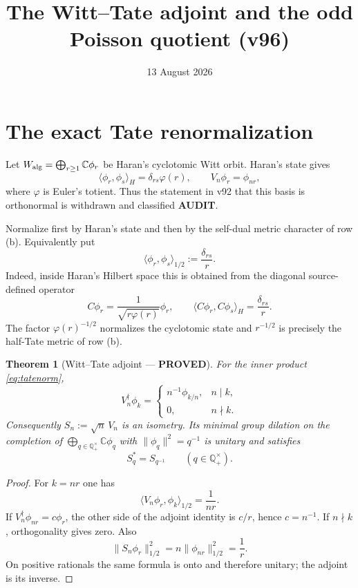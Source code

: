 \documentclass[11pt]{article}
\title{The Witt--Tate adjoint and the odd Poisson quotient (v96)}
\date{13 August 2026}
\newcommand{\PROVED}{\textcolor{green!40!black}{\textbf{PROVED}}}
\newcommand{\AUDIT}{\textcolor{orange!70!black}{\textbf{AUDIT}}}
\newtheorem{theorem}{Theorem}
\begin{document}
\maketitle

\section{The exact Tate renormalization}

Let $W_{\rm alg}=\bigoplus_{r\geq1}\mathbb C\phi_r$ be Haran's
cyclotomic Witt orbit.  Haran's state gives
\[
 \langle\phi_r,\phi_s\rangle_H=\delta_{rs}\varphi(r),
 \qquad V_n\phi_r=\phi_{nr},
\]
where $\varphi$ is Euler's totient.  Thus the statement in v92 that this
basis is orthonormal is withdrawn and classified \AUDIT.

Normalize first by Haran's state and then by the self-dual metric character
of row (b).  Equivalently put
\begin{equation}\label{eq:tatenorm}
 \langle\phi_r,\phi_s\rangle_{1/2}:=\frac{\delta_{rs}}{r}.
\end{equation}
Indeed, inside Haran's Hilbert space this is obtained from the diagonal
source-defined operator
\[
 C\phi_r=\frac1{\sqrt{r\varphi(r)}}\phi_r,
 \qquad
 \langle C\phi_r,C\phi_s\rangle_H=\frac{\delta_{rs}}r.
\]
The factor $\varphi(r)^{-1/2}$ normalizes the cyclotomic state and
$r^{-1/2}$ is precisely the half-Tate metric of row (b).

\begin{theorem}[Witt--Tate adjoint --- \PROVED]\label{thm:wittadjoint}
For the inner product \eqref{eq:tatenorm},
\begin{equation}\label{eq:Vadjoint}
 V_n^\dagger\phi_k=
 \begin{cases}
  n^{-1}\phi_{k/n},&n\mid k,\\
  0,&n\nmid k.
 \end{cases}
\end{equation}
Consequently $S_n:=\sqrt n\,V_n$ is an isometry.  Its minimal group dilation
on the completion of
$\bigoplus_{q\in\mathbb Q_+^\times}\mathbb C\phi_q$ with
$\|\phi_q\|^2=q^{-1}$ is unitary and satisfies
\[
 S_q^*=S_{q^{-1}}\qquad(q\in\mathbb Q_+^\times).
\]
\end{theorem}

\begin{proof}
For $k=nr$ one has
\[
 \langle V_n\phi_r,\phi_k\rangle_{1/2}=\frac1{nr}.
\]
If $V_n^\dagger\phi_{nr}=c\phi_r$, the other side of the adjoint identity is
$c/r$, hence $c=n^{-1}$.  If $n\nmid k$, orthogonality gives zero.  Also
\[
 \|S_n\phi_r\|_{1/2}^2
 =n\|\phi_{nr}\|_{1/2}^2=\frac1r.
\]
On positive rationals the same formula is onto and therefore unitary; the
adjoint is its inverse.
\end{proof}
\end{document}
